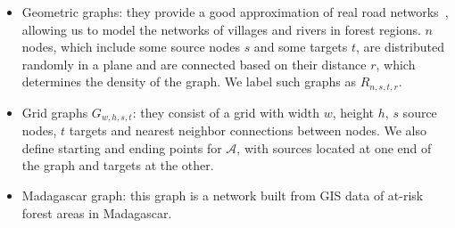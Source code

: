 \begin{itemize}
\item Geometric graphs: they provide a good approximation of real road networks~\cite{eppstein2008studying}, allowing us to model the networks of villages and rivers in forest regions. $n$ nodes, which include some source nodes $s$ and some targets $t$, are distributed randomly in a plane and are connected based on their distance $r$, which determines the density of the graph. We label such graphs as $R_{n,s,t,r}$.
\item Grid graphs $G_{w,h,s,t}$: they consist of a grid with width $w$, height $h$, $s$ source nodes, $t$ targets and nearest neighbor connections between nodes. We also define starting and ending points for $\mathcal{A}$, with sources located at one end of the graph and targets at the other.
\item Madagascar graph: this graph is a network built from GIS data of at-risk forest areas in Madagascar.
\end{itemize}

